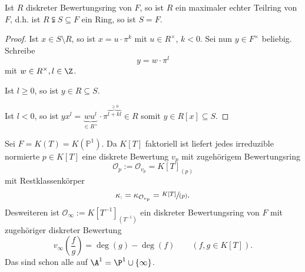 \begin{lemma}
    Ist $R$ diskreter Bewertungsring von $F$, so ist $R$ ein maximaler echter Teilring von $F$, d.h. ist
    $R \subsetneqq S \subseteq F$ ein Ring, so ist $S = F$.
\end{lemma}
\begin{proof}
    Ist $x \in S \setminus R$, so ist $x = u \cdot \pi^k$ mit $u \in R^\times$, $k< 0$.
    Sei nun $y \in F^\times$ beliebig. Schreibe
    $$ y = w \cdot \pi^l$$
    mit $w \in R^\times, l \in \Z$.

    Ist \underline{$l \geq 0$}, so ist $y \in R \subseteq S$.

    Ist \underline{$l < 0$}, so ist $yx^l=\underbrace{wu^l}_{\in R^\times} \cdot \pi^{\overbrace{l+kl}^{\geq 0}}\in R$
    somit $y \in R[x] \subseteq S$.
\end{proof}

\begin{beispiel}
    Sei $F = K(T) = K(\mathbb{P}^1)$. Da $K[T]$ faktoriell ist liefert jedes irreduzible normierte $p\in K[T]$ eine 
    diskrete Bewertung $v_p$ mit zugehörigem Bewertungsring
    $$ \mathcal{O}_p := \mathcal{O}_{v_p} = K[T]_{(p)}$$
    mit Restklassenkörper
    $$ \kappa_ := \kappa_{\mathcal{O}_{v_p}} = \sfrac{K[T]}{(p)}.$$
    Desweiteren ist $\mathcal{O}_\infty := K[T^{-1}]_{(T^{-1})}$ ein diskreter Bewertungsring von $F$ mit zugehöriger diskreter Bewertung
    $$v_\infty\left(\frac{f}{g}\right) = \deg(g) - \deg(f) \qquad (f,g \in K[T]) .$$
    Das sind schon alle auf $\A^1 = \P^1 \cup \{\infty\}$.
\end{beispiel}

